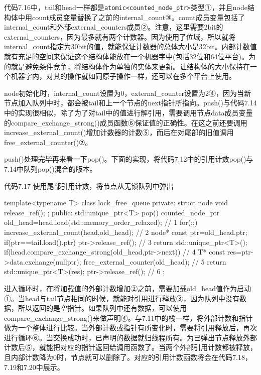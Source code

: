 代码7.16中，tail和head一样都是\texttt{atomic<counted\_node\_ptr>}类型①，并且node结构体中用count成员变量替换了之前的internal\_count③。count成员变量包括了internal\_count和外部external\_counters成员②。注意，这里需要2bit的external\_counters，因为最多就有两个计数器。因为使用了位域，所以就将internal\_count指定为30bit的值，就能保证计数器的总体大小是32bit。内部计数值就有充足的空间来保证这个结构体能放在一个机器字中(包括32位和64位平台)。为的就是避免条件竞争，将结构体作为单独的实体来更新。让结构体的大小保持在一个机器字内，对其的操作就如同原子操作一样，还可以在多个平台上使用。

node初始化时，internal\_count设置为0，external\_counter设置为2④，因为当新节点加入队列中时，都会被tail和上一个节点的next指针所指向。push()与代码7.14中的实现很相似，除了为了对tail中的值进行解引用，需要调用节点data成员变量的compare\_exchange\_strong()成员函数⑥保证值的正确性。在这之前还要调用increase\_external\_count()增加计数器的计数⑤，而后在对尾部的旧值调用free\_external\_counter()⑦。

push()处理完毕再来看一下pop()。下面的实现，将代码7.12中的引用计数pop()与7.14中队列pop()混合的版本。

代码7.17 使用尾部引用计数，将节点从无锁队列中弹出

\begin{cpp}
template<typename T>
class lock_free_queue
{
private:
  struct node
  {
    void release_ref();
  };
public:
  std::unique_ptr<T> pop()
  {
    counted_node_ptr old_head=head.load(std::memory_order_relaxed);  // 1
    for(;;)
    {
      increase_external_count(head,old_head);  // 2
      node* const ptr=old_head.ptr;
      if(ptr==tail.load().ptr)
      {
        ptr->release_ref();  // 3
        return std::unique_ptr<T>();
      }
      if(head.compare_exchange_strong(old_head,ptr->next))  // 4
      {
        T* const res=ptr->data.exchange(nullptr);
        free_external_counter(old_head);  // 5
        return std::unique_ptr<T>(res);
      }
      ptr->release_ref();  // 6
    }
  }
};
\end{cpp}

进入循环时，在将加载值的外部计数增加②之前，需要加载old\_head值作为启动①。当head与tail节点相同的时候，就能对引用进行释放③，因为队列中没有数据，所以返回的是空指针。如果队列中还有数据，可以使用compare\_exchange\_strong()来做声明④。与7.11中的栈一样，将外部计数和指针做为一个整体进行比较。当外部计数或指针有所变化时，需要将引用释放后，再次进行循环⑥。当交换成功时，已声明的数据就归线程所有。为已弹出节点释放外部计数后⑤，就能把对应的指针返回给调用函数了。当两个外部引用计数都被释放，且内部计数降为0时，节点就可以删除了。对应的引用计数函数将会在代码7.18，7.19和7.20中展示。


